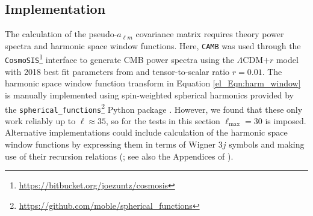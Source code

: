 \subsection{Implementation}

The calculation of the pseudo-$a_{\ell m}$ covariance matrix requires theory power spectra and harmonic space window functions. Here, \texttt{CAMB} \citep{Lewis2000, Howlett2012} was used through the \texttt{CosmoSIS}\footnote{\url{https://bitbucket.org/joezuntz/cosmosis}} interface \citep{Zuntz2015} to generate CMB power spectra using the $\Lambda$CDM$+r$ model with \Planck{} 2018 best fit parameters from \citet{Planck2018VI} and tensor-to-scalar ratio $r = 0.01$. The harmonic space window function transform in Equation \eqref{el_Eqn:harm_window} is manually implemented using spin-weighted spherical harmonics provided by the \texttt{spherical\_functions}\footnote{\url{https://github.com/moble/spherical\_functions}} Python package \citep{Boyle2021}. However, we found that these only work reliably up to $\ell \approx 35$, so for the tests in this section $\ell_\mathrm{max} = 30$ is imposed. Alternative implementations could include calculation of the harmonic space window functions by expressing them in terms of Wigner $3j$ symbols \citep{Hivon2002} and making use of their recursion relations (\citealt{Lewis2001}; see also the Appendices of \citealt{Hamimeche2008, Hamimeche2009}).

